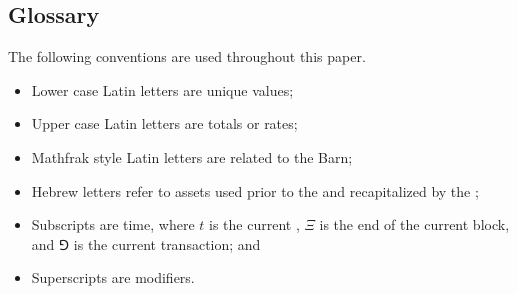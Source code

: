 \documentclass[class=article, crop=false]{standalone}
\begin{document}
\subsection{Glossary}
The following conventions are used throughout this paper.
\begin{itemize}
    \item Lower case Latin letters are unique values;
    \item Upper case Latin letters are totals or rates;
    \item Mathfrak style Latin letters are related to the Barn; 
    \item Hebrew letters refer to assets used prior to the  and recapitalized by the ;
    \item Subscripts are time, where $t$ is the current , $\Xi$ is the end of the current block, and $\Game$ is the current transaction; and
    \item Superscripts are modifiers.
\end{itemize}
\end{document}
